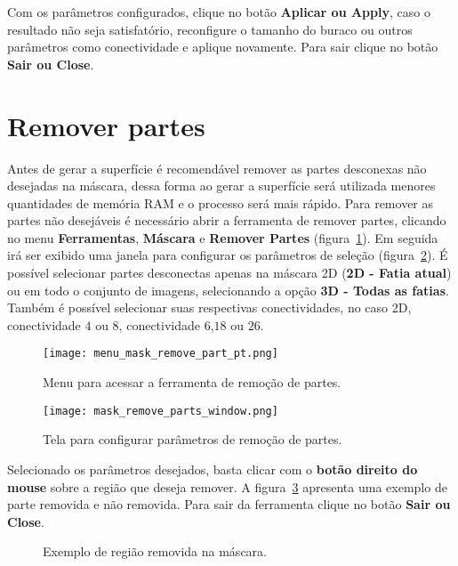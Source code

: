 Com os parâmetros configurados, clique no botão \textbf{Aplicar ou Apply}, caso o resultado não seja satisfatório, reconfigure o tamanho do buraco ou outros parâmetros como conectividade e aplique novamente. Para sair clique no botão \textbf{Sair ou Close}.

\section{Remover partes}

Antes de gerar a superfície é recomendável remover as partes desconexas não desejadas na máscara, dessa forma ao gerar a superfície será utilizada menores quantidades de memória RAM e o processo será mais rápido. Para remover as partes não desejáveis é necessário abrir a ferramenta de remover partes, clicando no menu \textbf{Ferramentas}, \textbf{Máscara} e \textbf{Remover Partes} (figura~\ref{fig:menu_mask_remove_part}). Em seguida irá ser exibido uma janela para configurar os parâmetros de seleção (figura~\ref{fig:mask_remove_parts_window}). É possível selecionar partes desconectas apenas na máscara 2D (\textbf{2D - Fatia atual}) ou em todo o conjunto de imagens, selecionando a opção \textbf{3D - Todas as fatias}. Também é possível selecionar suas respectivas conectividades, no caso 2D, conectividade $4$ ou $8$, conectividade $6$,$18$ ou $26$.

\begin{figure}[!htb]
\centering
\texttt{[image: menu\_mask\_remove\_part\_pt.png]}
\caption{Menu para acessar a ferramenta de remoção de partes.}
\label{fig:menu_mask_remove_part}
\end{figure}

\begin{figure}[!htb]
\centering
\texttt{[image: mask\_remove\_parts\_window.png]}
\caption{Tela para configurar parâmetros de remoção de partes.}
\label{fig:mask_remove_parts_window}
\end{figure}

Selecionado os parâmetros desejados, basta clicar com o \textbf{botão direito do mouse} sobre a região que deseja remover. A figura~\ref{fig:mask_removed_part} apresenta uma exemplo de parte removida e não removida. Para sair da ferramenta clique no botão \textbf{Sair ou Close}.

\begin{figure}[!htb]
  \centering
    \qquad
  \hfill
  \caption{Exemplo de região removida na máscara.}
  \label{fig:mask_removed_part}
\end{figure}

